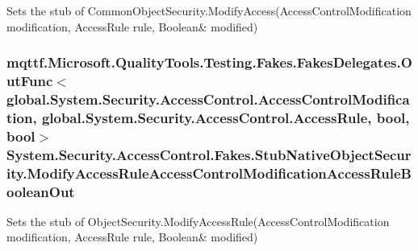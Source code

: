 Sets the stub of Common\-Object\-Security.\-Modify\-Access(Access\-Control\-Modification modification, Access\-Rule rule, Boolean\& modified)

\hypertarget{class_system_1_1_security_1_1_access_control_1_1_fakes_1_1_stub_native_object_security_a670b92f190de7dec3fc039b300dd4690}{
\subsubsection[{Modify\-Access\-Rule\-Access\-Control\-Modification\-Access\-Rule\-Boolean\-Out}]{\setlength{\rightskip}{0pt plus 5cm}mqttf.\-Microsoft.\-Quality\-Tools.\-Testing.\-Fakes.\-Fakes\-Delegates.\-Out\-Func$<$global.\-System.\-Security.\-Access\-Control.\-Access\-Control\-Modification, global.\-System.\-Security.\-Access\-Control.\-Access\-Rule, bool, bool$>$ System.\-Security.\-Access\-Control.\-Fakes.\-Stub\-Native\-Object\-Security.\-Modify\-Access\-Rule\-Access\-Control\-Modification\-Access\-Rule\-Boolean\-Out}}\label{class_system_1_1_security_1_1_access_control_1_1_fakes_1_1_stub_native_object_security_a670b92f190de7dec3fc039b300dd4690}


Sets the stub of Object\-Security.\-Modify\-Access\-Rule(Access\-Control\-Modification modification, Access\-Rule rule, Boolean\& modified)

